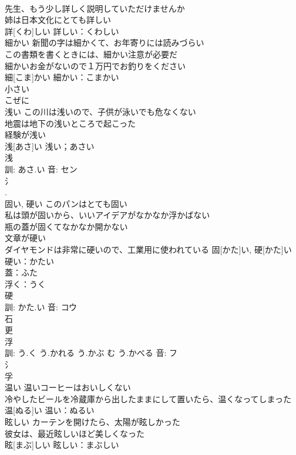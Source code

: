 \documentclass[8pt]{extreport}
\begin{document}
\begin{CJK}{UTF8}{min}
\\	先生、もう少し詳しく説明していただけませんか 
\\	姉は日本文化にとても詳しい 
\\	詳[くわ]しい			詳しい：くわしい
\\	細かい	新聞の字は細かくて、お年寄りには読みづらい 
\\	この書類を書くときには、細かい注意が必要だ 
\\	細かいお金がないので１万円でお釣りをください 
\\	細[こま]かい			細かい：こまかい
\\	小さい 
\\	こぜに 
\\	浅い	この川は浅いので、子供が泳いでも危なくない 
\\	地震は地下の浅いところで起こった 
\\	経験が浅い 
\\	浅[あさ]い			浅い；あさい
\\	浅 
\\	訓: あさ.い 音: セン 
\\	氵 
\\	[淺].	
\\	固い, 硬い	このパンはとても固い 
\\	私は頭が固いから、いいアイデアがなかなか浮かばない 
\\	瓶の蓋が固くてなかなか開かない 
\\	文章が硬い 
\\	ダイヤモンドは非常に硬いので、工業用に使われている	固[かた]い, 硬[かた]い			硬い：かたい
\\	蓋：ふた
\\	浮く：うく
\\	硬 
\\	訓: かた.い 音: コウ 
\\	石 
\\	更 
\\	浮 
\\	訓: う.く う.かれる う.かぶ む う.かべる 音: フ 
\\	氵 
\\	孚 
\\	温い	温いコーヒーはおいしくない 
\\	冷やしたビールを冷蔵庫から出したままにして置いたら、温くなってしまった 
\\	温[ぬる]い			温い：ぬるい
\\	眩しい	カーテンを開けたら、太陽が眩しかった 
\\	彼女は、最近眩しいほど美しくなった 
\\	眩[まぶ]しい			眩しい：まぶしい

\end{CJK}
\end{document}
